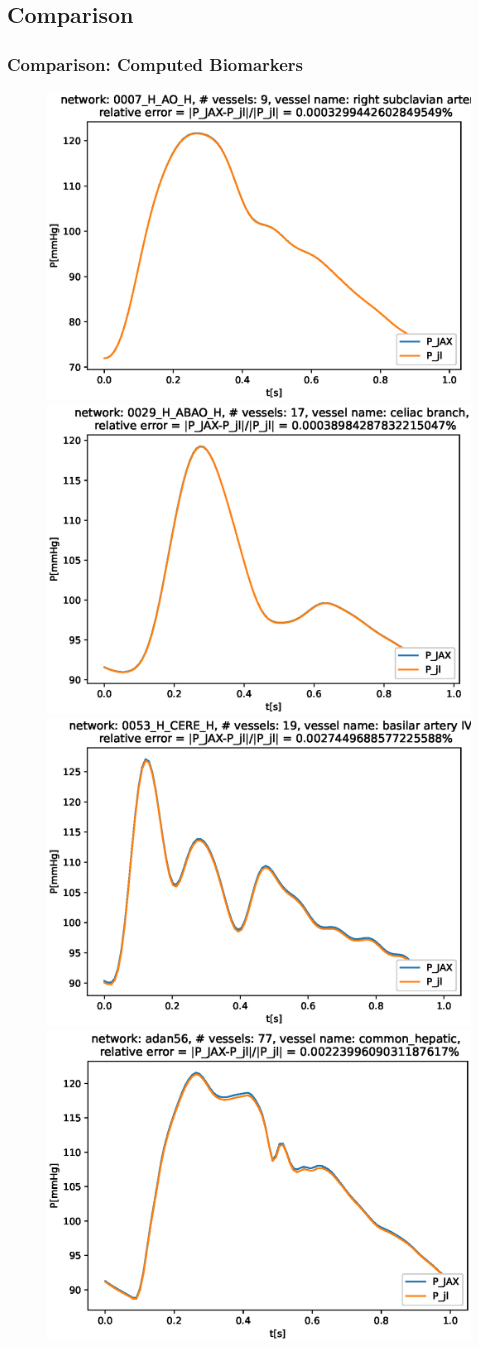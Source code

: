 \documentclass[compress]{beamer}
\begin{document}
\subsection{Comparison}
\begin{frame}
	\frametitle{Comparison: Computed Biomarkers}
	\begin{figure} [H]
		\centering
		\includegraphics[width=0.46\columnwidth]{../figures/0007_H_AO_H_right_subclavian_artery_P.eps}
		\includegraphics[width=0.46\columnwidth]{../figures/0029_H_ABAO_H_celiac_branch_P.eps
		}
		\includegraphics[width=0.46\columnwidth]{../figures/0053_H_CERE_H_basilar_artery_IV_P.eps}
		\includegraphics[width=0.46\columnwidth]{../figures/adan56_common_hepatic_P.eps}
		\label{fig:val}
	\end{figure}
\end{frame}
\end{document}
